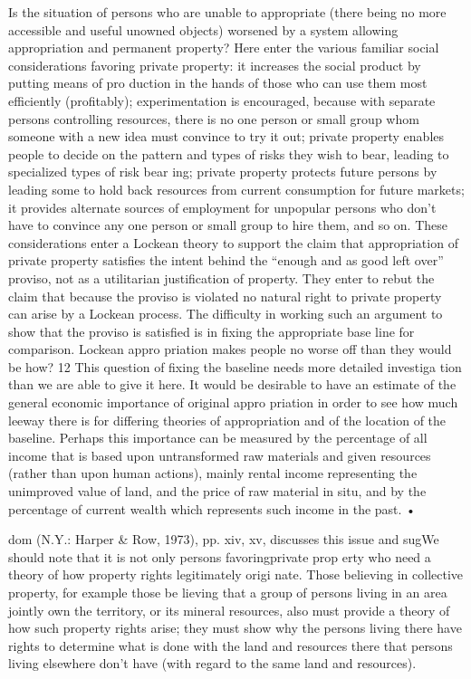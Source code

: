 \documentclass[11pt,openany]{book}
\begin{document}
Is the situation of persons who are unable to appropriate (there being no more accessible and useful unowned objects) worsened by a system allowing appropriation and permanent property? Here enter the various familiar social considerations favoring private property: it increases the social product by putting means of pro duction in the hands of those who can use them most efficiently (profitably); experimentation is encouraged, because with separate persons controlling resources, there is no one person or small group whom someone with a new idea must convince to try it out; private property enables people to decide on the pattern and types of risks they wish to bear, leading to specialized types of risk bear ing; private property protects future persons by leading some to hold back resources from current consumption for future markets; it provides alternate sources of employment for unpopular persons who don't have to convince any one person or small group to hire them, and so on. These considerations enter a Lockean theory to support the claim that appropriation of private property satisfies the intent behind the ``enough and as good left over'' proviso, not as a utilitarian justification of property. They enter to rebut the claim that because the proviso is violated no natural right to private property can arise by a Lockean process. The difficulty in working such an argument to show that the proviso is satisfied is in fixing the appropriate base line for comparison. Lockean appro priation makes people no worse off than they would be how? 12 This question of fixing the baseline needs more detailed investiga tion than we are able to give it here. It would be desirable to have an estimate of the general economic importance of original appro priation in order to see how much leeway there is for differing theories of appropriation and of the location of the baseline. Perhaps this importance can be measured by the percentage of all income that is based upon untransformed raw materials and given resources (rather than upon human actions), mainly rental income representing the unimproved value of land, and the price of raw material in situ, and by the percentage of current wealth which represents such income in the past. • 

dom (N.Y.: Harper \& Row, 1973), pp. xiv, xv, discusses this issue and sugWe should note that it is not only persons favoringprivate prop erty who need a theory of how property rights legitimately origi nate. Those believing in collective property, for example those be lieving that a group of persons living in an area jointly own the territory, or its mineral resources, also must provide a theory of how such property rights arise; they must show why the persons living there have rights to determine what is done with the land and resources there that persons living elsewhere don't have (with regard to the same land and resources). 
\end{document}
